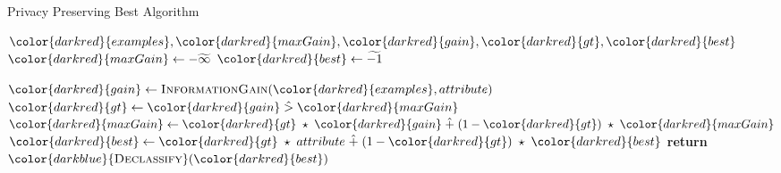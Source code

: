\begin{algorithm}[H]
\caption{Privacy Preserving Best Algorithm}\label{a:id3-best-pp}
\begin{algorithmic}[1]
\Require ${\color{darkred}{examples}}, {\color{darkred}{maxGain}}, {\color{darkred}{gain}}, {\color{darkred}{gt}}, {\color{darkred}{best}}$
    \State ${\color{darkred}{maxGain}} \gets -\enc{\infty}$
    \State ${\color{darkred}{best}} \gets \enc{-1}$

        \State ${\color{darkred}{gain}} \gets  \textsc{InformationGain}({\color{darkred}{examples}}, attribute)$
        \State ${\color{darkred}{gt}} \gets {\color{darkred}{gain}} \hgt  {\color{darkred}{maxGain}}$
        \State ${\color{darkred}{maxGain}} \gets {\color{darkred}{gt}} \hmul {\color{darkred}{gain}} \hplus (1 - {\color{darkred}{gt}}) \hmul {\color{darkred}{maxGain}}$ 
        \State ${\color{darkred}{best}} \gets {\color{darkred}{gt}} \hmul attribute \hplus (1 - {\color{darkred}{gt}}) \hmul {\color{darkred}{best}}$
    \EndFor
    \State \textbf{return} ${\color{darkblue}{\textsc{Declassify}}}({\color{darkred}{best}})$
\EndProcedure
\end{algorithmic}
\end{algorithm}